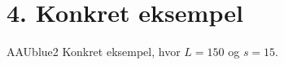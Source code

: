 \section*{4. Konkret eksempel}
%
\begin{color}{AAUblue2}
Konkret eksempel, hvor $L=150$ og $s=15$.
\end{color}
%
% 




